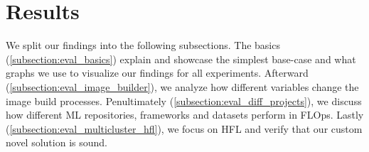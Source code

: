 \section{Results}

We split our findings into the following subsections.
The basics (\ref{subsection:eval_basics}) explain and showcase the simplest base-case and what graphs we use to visualize our findings for all experiments.
Afterward (\ref{subsection:eval_image_builder}), we analyze how different variables change the image build processes.
Penultimately (\ref{subsection:eval_diff_projects}), we discuss how different ML repositories, frameworks and datasets perform in FLOps.
Lastly (\ref{subsection:eval_multicluster_hfl}), we focus on HFL and verify that our custom novel solution is sound.







